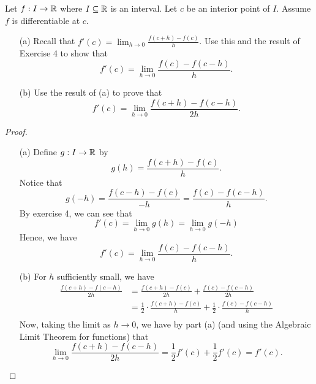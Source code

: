 \documentclass[a4paper]{article}
\begin{document}
\begin{problem}
    Let \( f: I \to \mathbb{R}  \) where \( I \subseteq \mathbb{R}   \) is an interval. Let \( c  \) be an interior point of \( I  \). Assume \( f  \) is differentiable at \( c  \). 
    \begin{enumerate}
        \item[(a)] Recall that \( f'(c) = \displaystyle \lim_{ h \to 0 }  \frac{ f(c+h) - f(c) }{ h }   \). Use this and the result of Exercise 4 to show that
            \[  f'(c) = \lim_{ h \to 0 }  \frac{ f(c) - f(c-h) }{ h }. \]
        \item[(b)] Use the result of (a) to prove that 
            \[  f'(c) = \lim_{ h \to 0 }  \frac{ f(c+h) - f(c-h) }{ 2h }. \]
    \end{enumerate}
\end{problem}
\begin{proof}
\begin{enumerate}
    \item[(a)] Define \( g: I \to \mathbb{R}  \) by
        \[  g(h)  = \frac{ f(c+h) - f(c) }{ h }.  \]
        Notice that 
        \[  g(-h) = \frac{ f(c -h) - f(c) }{ -h } = \frac{ f(c) - f(c-h) }{ h }. \]
        By exercise 4, we can see that  
        \[  f'(c) = \lim_{ h \to 0 }  g(h) = \lim_{ h \to 0 } g(-h)  \]
        Hence, we have 
        \[  f'(c) = \lim_{ h \to 0 }  \frac{ f(c) - f(c-h) }{ h }. \]
    \item[(b)] For \( h  \) sufficiently small, we have  
        \begin{align*}
            \frac{ f(c+h) - f(c-h)  }{ 2h } &= \frac{ f(c+h) - f(c) }{ 2h }  + \frac{ f(c) - f(c-h) }{ 2h }  \\
                                            &= \frac{ 1 }{ 2 }  \cdot \frac{ f(c+h) - f(c) }{ h }  + \frac{ 1 }{ 2 } \cdot \frac{ f(c) - f(c-h) }{ h }  \\ 
        \end{align*}
        Now, taking the limit as \( h \to 0  \), we have by part (a) (and using the Algebraic Limit Theorem for functions) that
        \[ \lim_{ h \to 0 }  \frac{ f(c+h) - f(c-h) }{  2h } = \frac{ 1 }{ 2 } f'(c) + \frac{ 1 }{ 2 }  f'(c) = f'(c).  \]
\end{enumerate}
\end{proof}
\end{document}
